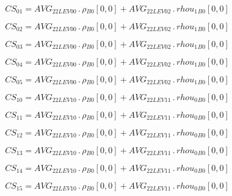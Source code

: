 \documentclass{article}
\begin{document}
\begin{dmath}CS_{01} = AVG_{2 2 LEV 00} \,.\, {\rho{_{B0}}}[{0,0}] + AVG_{2 2 LEV 02} \,.\, {rhou_{1}{_{B0}}}[{0,0}]\end{dmath}

\begin{dmath}CS_{02} = AVG_{2 2 LEV 00} \,.\, {\rho{_{B0}}}[{0,0}] + AVG_{2 2 LEV 02} \,.\, {rhou_{1}{_{B0}}}[{0,0}]\end{dmath}

\begin{dmath}CS_{03} = AVG_{2 2 LEV 00} \,.\, {\rho{_{B0}}}[{0,0}] + AVG_{2 2 LEV 02} \,.\, {rhou_{1}{_{B0}}}[{0,0}]\end{dmath}

\begin{dmath}CS_{04} = AVG_{2 2 LEV 00} \,.\, {\rho{_{B0}}}[{0,0}] + AVG_{2 2 LEV 02} \,.\, {rhou_{1}{_{B0}}}[{0,0}]\end{dmath}

\begin{dmath}CS_{05} = AVG_{2 2 LEV 00} \,.\, {\rho{_{B0}}}[{0,0}] + AVG_{2 2 LEV 02} \,.\, {rhou_{1}{_{B0}}}[{0,0}]\end{dmath}

\begin{dmath}CS_{10} = AVG_{2 2 LEV 10} \,.\, {\rho{_{B0}}}[{0,0}] + AVG_{2 2 LEV 11} \,.\, {rhou_{0}{_{B0}}}[{0,0}]\end{dmath}

\begin{dmath}CS_{11} = AVG_{2 2 LEV 10} \,.\, {\rho{_{B0}}}[{0,0}] + AVG_{2 2 LEV 11} \,.\, {rhou_{0}{_{B0}}}[{0,0}]\end{dmath}

\begin{dmath}CS_{12} = AVG_{2 2 LEV 10} \,.\, {\rho{_{B0}}}[{0,0}] + AVG_{2 2 LEV 11} \,.\, {rhou_{0}{_{B0}}}[{0,0}]\end{dmath}

\begin{dmath}CS_{13} = AVG_{2 2 LEV 10} \,.\, {\rho{_{B0}}}[{0,0}] + AVG_{2 2 LEV 11} \,.\, {rhou_{0}{_{B0}}}[{0,0}]\end{dmath}

\begin{dmath}CS_{14} = AVG_{2 2 LEV 10} \,.\, {\rho{_{B0}}}[{0,0}] + AVG_{2 2 LEV 11} \,.\, {rhou_{0}{_{B0}}}[{0,0}]\end{dmath}

\begin{dmath}CS_{15} = AVG_{2 2 LEV 10} \,.\, {\rho{_{B0}}}[{0,0}] + AVG_{2 2 LEV 11} \,.\, {rhou_{0}{_{B0}}}[{0,0}]\end{dmath}
\end{document}
